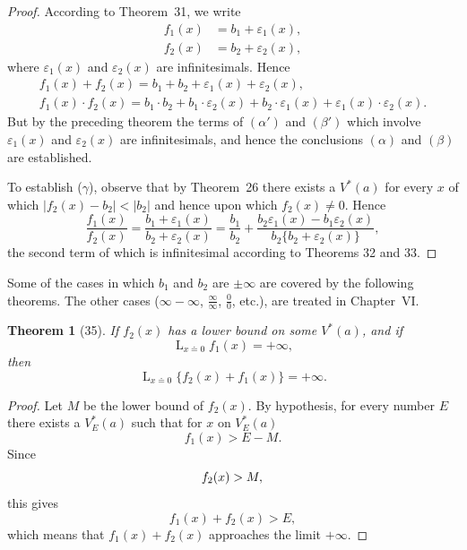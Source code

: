 \documentclass[a4paper,12pt]{book}[2004/02/16]
\providecommand{\hyperlink}[2]{#2}
\providecommand{\hypertarget}[2]{#2}
\theoremstyle{ilemma}
\theoremstyle{itheorem}
\newtheorem{theorem}{Theorem}
\theoremstyle{iother}
\theoremstyle{icorollary}
\theoremstyle{numcorollary}
\theoremstyle{idefinition}
\renewcommand{\dfrac}[2]{\frac{#1}{#2}}%
\begin{document}
\begin{proof}
According to Theorem~\hyperlink{thm31}{31}, we write
\begin{align*}
f_1(x) &= b_1 + \varepsilon_1(x),\\
f_2(x) &= b_2 + \varepsilon_2(x),
\end{align*}
where $\varepsilon_1(x)$ and $\varepsilon_2(x)$ are
infinitesimals. Hence
\begin{gather*}
\tag{$\alpha'$}
  f_1(x) + f_2(x) = b_1 + b_2 + \varepsilon_1(x) + \varepsilon_2(x),
\\
\tag{$\beta'$}
  f_1(x)\cdot f_2(x) = b_1 \cdot b_2
+ b_1 \cdot \varepsilon_2(x) + b_2 \cdot \varepsilon_1(x)
+ \varepsilon_1(x) \cdot \varepsilon_2(x).
\end{gather*}
But by the preceding theorem the terms of $(\alpha')$ and $(\beta')$
which involve $\varepsilon_1(x)$ and $\varepsilon_2(x)$ are
infinitesimals, and hence the conclusions $(\alpha)$ and $(\beta)$ are
established.

To establish ($\gamma$), observe that by Theorem~\hyperlink{thm26}{26} there exists a
$V^*(a)$ for every $x$ of which $|f_2(x)-b_2|< |b_2|$ and hence upon
which $f_2(x)\neq 0$. Hence
\[
  \frac{f_1(x)}{f_2(x)}
= \frac{b_1 + \varepsilon_1(x)}{b_2 + \varepsilon_2(x)}
= \frac{b_1}{b_2} + \frac{b_2 \varepsilon_1(x)-b_1 \varepsilon_2(x)}
                         {b_2 \{ b_2 + \varepsilon_2(x) \}},
\]
the second term of which is infinitesimal according to Theorems \hyperlink{thm32}{32} and
\hyperlink{thm33}{33}.
\end{proof}

Some of the cases in which $b_1$ and $b_2$ are $\pm\infty$ are covered
by the following theorems. The other cases ($\infty-\infty$,
$\dfrac{\infty}{\infty}$, $\dfrac{0}{0}$, etc.), are treated in
Chapter~\hyperlink{chapVI}{VI}.

\begin{theorem}[35]\hypertarget{thm35}{}
If $f_2(x)$ has a lower bound on some $V^*(a)$, and if
\[
  \mathop{L}_{x \doteq 0} f_1(x) = +\infty,
\]
then
\[
  \mathop{L}_{x \doteq 0} \{f_2(x) + f_1(x)\} = +\infty.
\]
\end{theorem}

\begin{proof}
Let $M$ be the lower bound of $f_2(x)$. By hypothesis, for every
number $E$ there exists a $V_E^*(a)$ such that for $x$ on $V_E^*(a)$
\[
  f_1(x) > E-M.
\]
Since
\[
  f_2(x) > M,\\
\]
this gives
\[
  f_1(x) + f_2(x) > E,
\]
which means that $ f_1(x) + f_2(x)$ approaches the limit $+\infty$.
\end{proof}
\end{document}
